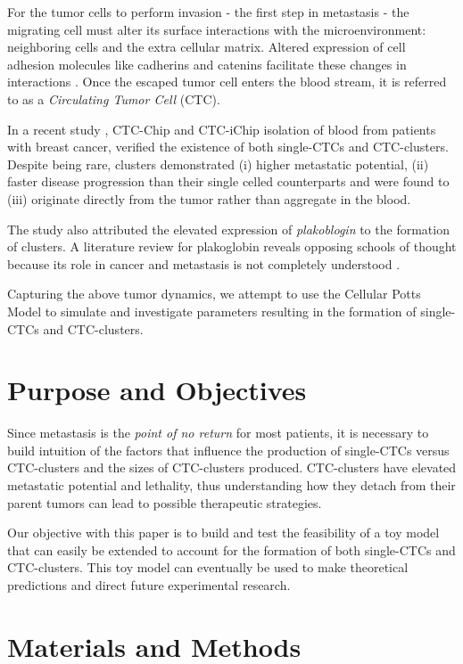 \documentclass[12pt]{article}
\begin{document}
For the tumor cells to perform invasion - the first step in metastasis - the migrating cell must alter its surface interactions with the microenvironment: neighboring cells and the extra cellular matrix. Altered expression of cell adhesion molecules like cadherins and catenins facilitate these changes in interactions \cite{Aktary2012}\cite{Zhurinsky2000}. Once the escaped tumor cell enters the blood stream, it is referred to as a \emph{Circulating Tumor Cell} (CTC).

In a recent study \cite{Aceto2014}, CTC-Chip and CTC-iChip isolation of blood from patients with breast cancer, verified the existence of both single-CTCs and CTC-clusters. Despite being rare,  clusters demonstrated (i) higher metastatic potential, (ii) faster disease progression than their single celled counterparts and were found to (iii) originate directly from the tumor rather than aggregate in the blood.

The study also attributed the elevated expression of \emph{plakoblogin} to the formation of clusters. A literature review for plakoglobin reveals opposing schools of thought because its role in cancer and metastasis is not completely understood \cite{Aktary2012}\cite{Zhurinsky2000}.

Capturing the above tumor dynamics, we attempt to use the Cellular Potts Model to simulate and investigate parameters resulting in the formation of single-CTCs and CTC-clusters.

\section{Purpose and Objectives}
Since metastasis is the \emph{point of no return} for most patients, it is necessary to build intuition of the factors that influence the production of single-CTCs versus CTC-clusters and the sizes of CTC-clusters produced. CTC-clusters have elevated metastatic potential and lethality, thus understanding how they detach from their parent tumors can lead to possible therapeutic strategies.

Our objective with this paper is to build and test the feasibility of a toy model that can easily be extended to account for the formation of both single-CTCs and CTC-clusters. This toy model can eventually be used to make theoretical predictions and direct future experimental research.

\section{Materials and Methods}
\end{document}
